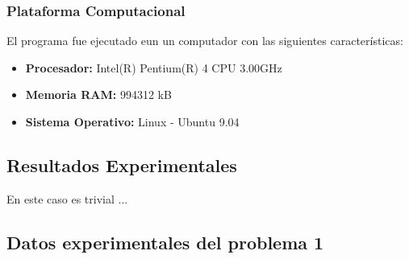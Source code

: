 \documentclass{report}
\begin{document}
\subsection{Plataforma Computacional}
El programa fue ejecutado eun un computador con las siguientes caracter\'isticas:
\begin{itemize}
\item {\bf Procesador:} Intel(R) Pentium(R) 4 CPU 3.00GHz
\item {\bf Memoria RAM:} 994312 kB
\item {\bf Sistema Operativo:} Linux - Ubuntu 9.04 
\end{itemize}
%
\section{Resultados Experimentales}
En este caso es trivial ...
%
\begin{appendices}

\chapter{Datos experimentales del problema 1}

\end{appendices}
\end{document}
